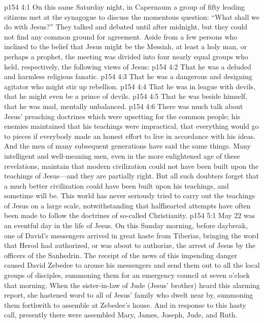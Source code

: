 \vs p154 4:1 On this same Saturday night, in Capernaum a group of fifty leading citizens met at the synagogue to discuss the momentous question: “What shall we do with Jesus?” They talked and debated until after midnight, but they could not find any common ground for agreement. Aside from a few persons who inclined to the belief that Jesus might be the Messiah, at least a holy man, or perhaps a prophet, the meeting was divided into four nearly equal groups who held, respectively, the following views of Jesus:
\pc \vs p154 4:2 \bibnobreakspace That he was a deluded and harmless religious fanatic.
\vs p154 4:3 \bibnobreakspace That he was a dangerous and designing agitator who might stir up rebellion.
\vs p154 4:4 \bibnobreakspace That he was in league with devils, that he might even be a prince of devils.
\vs p154 4:5 \bibnobreakspace That he was beside himself, that he was mad, mentally unbalanced.
\pc \vs p154 4:6 There was much talk about Jesus’ preaching doctrines which were upsetting for the common people; his enemies maintained that his teachings were impractical, that everything would go to pieces if everybody made an honest effort to live in accordance with his ideas. And the men of many subsequent generations have said the same things. Many intelligent and well\hyp{}meaning men, even in the more enlightened age of these revelations, maintain that modern civilization could not have been built upon the teachings of Jesus---and they are partially right. But all such doubters forget that a much better civilization could have been built upon his teachings, and sometime will be. This world has never seriously tried to carry out the teachings of Jesus on a large scale, notwithstanding that halfhearted attempts have often been made to follow the doctrines of so\hyp{}called Christianity.\plusone
{}
\vs p154 5:1 May 22 was an eventful day in the life of Jesus. On this Sunday morning, before daybreak, one of David’s messengers arrived in great haste from Tiberias, bringing the word that Herod had authorized, or was about to authorize, the arrest of Jesus by the officers of the Sanhedrin. The receipt of the news of this impending danger caused David Zebedee to arouse his messengers and send them out to all the local groups of disciples, summoning them for an emergency council at seven o’clock that morning. When the sister\hyp{}in\hyp{}law of Jude (Jesus’ brother) heard this alarming report, she hastened word to all of Jesus’ family who dwelt near by, summoning them forthwith to assemble at Zebedee’s house. And in response to this hasty call, presently there were assembled Mary, James, Joseph, Jude, and Ruth.
